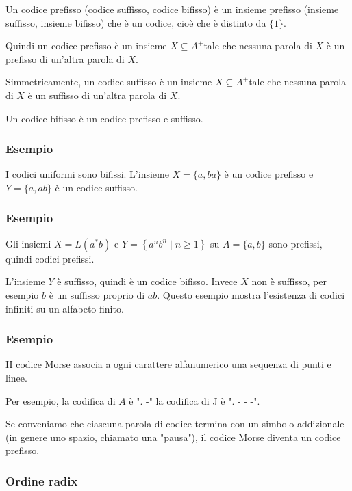 \vspace{5mm}

Un codice prefisso (codice suffisso, codice bifisso) è un insieme prefisso (insieme suffisso, insieme bifisso) che è un codice, cioè che è distinto da $\{1\}$.

Quindi un codice prefisso è un insieme $X \subseteq A^{+}$tale che nessuna parola di $X$ è un prefisso di un'altra parola di $X$.

Simmetricamente, un codice suffisso è un insieme $X \subseteq A^{+}$tale che nessuna parola di $X$ è un suffisso di un'altra parola di $X$.

Un codice bifisso è un codice prefisso e suffisso.

\subsubsection{Esempio}

I codici uniformi sono bifissi.
L'insieme $X=\{a, b a\}$ è un codice prefisso e $Y=\{a, a b\}$ è un codice suffisso.

\subsubsection{Esempio}

Gli insiemi $X=L\left(a^{*} b\right)$ e $Y=\left\{a^{n} b^{n} \mid n \geq 1\right\}$ su $A=\{a, b\}$ sono prefissi, quindi codici prefissi.

L'insieme $Y$ è suffisso, quindi è un codice bifisso.
Invece $X$ non è suffisso, per esempio $b$ è un suffisso proprio di $a b$.
Questo esempio mostra l'esistenza di codici infiniti su un alfabeto finito.

\subsubsection{Esempio}

II codice Morse associa a ogni carattere alfanumerico una sequenza di punti e linee.

Per esempio, la codifica di $A$ è ". -" la codifica di J è ". - - -".

Se conveniamo che ciascuna parola di codice termina con un simbolo addizionale (in genere uno spazio, chiamato una "pausa"), il codice Morse diventa un codice prefisso.

\subsubsection{Ordine radix}

